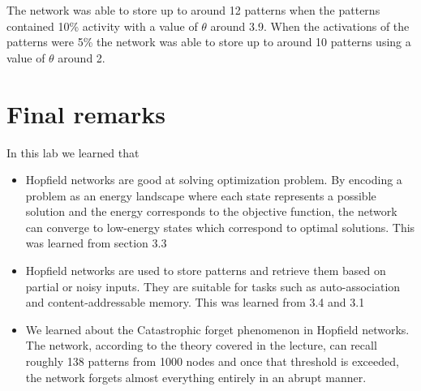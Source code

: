 \documentclass[a4paper]{article}
\begin{document}
The network was able to store up to around 12 patterns when the patterns contained 10\% activity with a value of $\theta$ around 3.9. When the activations of the patterns were 5\% the network was able to store up to around 10 patterns using a value of $\theta$ around 2. 


\section{Final remarks}
In this lab we learned that 
\begin{itemize}
    \item Hopfield networks are good at solving optimization problem. By encoding a problem as an energy landscape where each state represents a possible solution and the energy corresponds to the objective function, the network can converge to low-energy states which correspond to optimal solutions. This was learned from section 3.3 
    \item Hopfield networks are used to store patterns and retrieve them based on partial or noisy inputs. They are suitable for tasks such as auto-association and content-addressable memory. This was learned from 3.4 and 3.1 
    \item We learned about the Catastrophic forget phenomenon in Hopfield networks. The network, according to the theory covered in the lecture, can recall roughly 138 patterns from 1000 nodes and once that threshold is exceeded, the network forgets almost everything entirely in an abrupt manner.
    \end{itemize}
\end{document}

